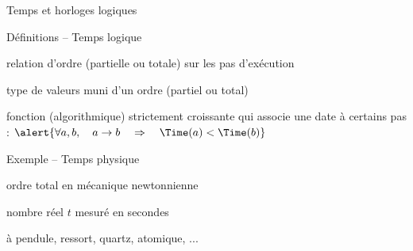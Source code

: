 
\begingroup


\begin{frame}{Temps et horloges logiques}
  
  \vspace{-1mm}
  \begin{block}{Définitions -- Temps logique}
    \vspace{-2mm}
    \begin{description}[Horloge :]
    \item[Temps :] relation d'ordre \structure{$\rightarrow$} (partielle ou totale) sur les pas d'exécution
    \item[Date :] type de valeurs muni d'un ordre (partiel ou total) \structure{$\le$}
    \item[Horloge :] fonction (algorithmique) \alert{strictement croissante} \structure{$\Time$}
      qui associe une date à certains pas : 
      $\alert{\forall a, b, \quad a \rightarrow b \quad \Rightarrow \quad \Time(a) < \Time(b)}$
    \end{description}
  \end{block}

  \vspace{-1mm}
  \begin{exampleblock}{Exemple -- Temps physique}
    \vspace{-2mm}
    \begin{description}[Temps :]
    \item[Temps :] ordre total en mécanique newtonnienne
    \item[Date :] nombre réel $t$ mesuré en secondes
    \item[Horloge :] à pendule, ressort, quartz, atomique, ...
    \end{description}
  \end{exampleblock}

  \pause
  

\end{frame}
